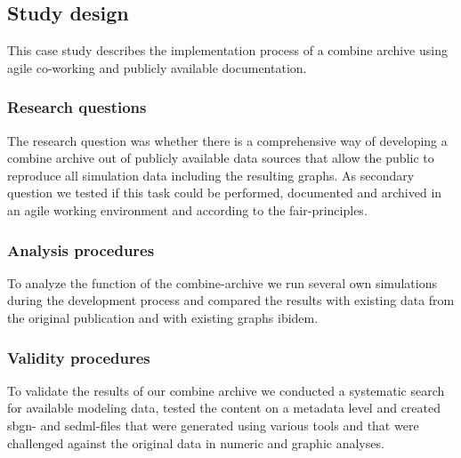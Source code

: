 \subsection*{Study design}
This case study describes the implementation process of a \ac{combine} archive using agile co-working and publicly available documentation.
\subsubsection*{Research questions}
The research question was whether there is a comprehensive way of developing a \ac{combine} archive out of publicly available data sources that allow the public to reproduce all simulation data including the resulting graphs. As secondary question we tested if this task could be performed, documented and archived in an agile working environment and according to the \acs{fair}-principles.
\subsubsection*{Analysis procedures}
To analyze the function of the \ac{combine}-archive we run several own simulations during the development process and compared the results with existing data from the original publication and with existing graphs ibidem.
\subsubsection*{Validity procedures}
To validate the results of our \ac{combine} archive we conducted a systematic search for available modeling data, tested the content on a metadata level and created \ac{sbgn}- and \ac{sedml}-files that were generated using various tools and that were challenged against the original data in numeric and graphic analyses.
